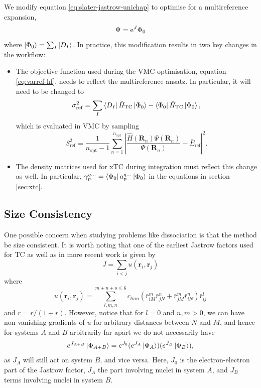 We modify equation \ref{eq:slater-jastrow-unichap} to optimise for a multireference expansion,
\begin{equation}
    \label{eq:general-slater-jastrow}
    \Psi = \mathrm{e}^J\Phi_0
\end{equation}
where $\ket{\Phi_0}=\sum_I\ket{D_I}$. In practice, this modification results in two key changes in the workflow:
\begin{itemize}
    \item The objective function used during the VMC optimisation, equation \ref{eq:varref-hf}, needs to reflect the multireference ansatz. In particular, it will need to be changed to
    \begin{equation}
        \label{eq:varref-md}
        \sigma_\mathrm{ref}^2 = \sum_{I}\bra{D_I}\hat H_\mathrm{TC}\ket{\Phi_0} - \bra{\Phi_0}\hat H_\mathrm{TC}\ket{\Phi_0},
    \end{equation}
    which is evaluated in VMC by sampling
    \begin{equation}
        S_\mathrm{ref}^2 =
          \frac 1 {n_\mathrm{opt}-1}
          \sum_{n=1}^{n_\mathrm{opt}}
            \left| \frac {\hat H({\bm R}_n) \Psi({\bm R}_n)}
                         {\Psi({\bm R}_n)} - {\bar E}_\mathrm{ref}
            \right|^2.
    \end{equation}
    \item The density matrices used for xTC during integration must reflect this change as well. In particular, $\gamma_{p\dots}^{q\dots}=\bra{\Phi_0} a_{p\dots}^{q\dots}\ket{\Phi_0}$ in the equations in section \ref{sec:xtc}.
\end{itemize}

\subsection{Size Consistency}

One possible concern when studying problems like dissociation is that the method be size consistent. It is worth noting that one of the earliest Jastrow factors used for TC\supercite{boysCalculation1969} as well as in more recent work\supercite{cohenSimilarity2019} is given by
\begin{equation}
\label{eq:boyshandyjastrow}
J = \sum_{i<j} u(\bm r_i, \bm r_j)
\end{equation}
where
\begin{equation}
u(\bm r_i, \bm r_j) = \sum_{l,m,n}^{m+n+o\leq 6} c_{lmn}(\bar r_{iM}^m\bar r_{jN}^n+\bar r_{jM}^m\bar r_{iN}^n)\bar r_{ij}^l
\end{equation}
and $\bar r = r/(1+r)$.
However, notice that for $l=0$ and $n,m>0$, we can have non-vanishing gradients of $u$ for arbitrary distances between $N$ and $M$, and hence for systems $A$ and $B$ arbitrarily far apart we do not necessarily have
\begin{equation}
\label{eq:size-consistency}
e^{J_{A+B}}\ket{\Phi_{A+B}} = e^{J_0}(e^{J_{A}}\ket{\Phi_{A}})(e^{J_{B}}\ket{\Phi_{B}}),
\end{equation}
as $J_A$ will still act on system $B$, and vice versa. Here, $J_0$ is the electron-electron part of the Jastrow factor, $J_A$ the part involving nuclei in system $A$, and $J_B$ terms involving nuclei in system $B$.

